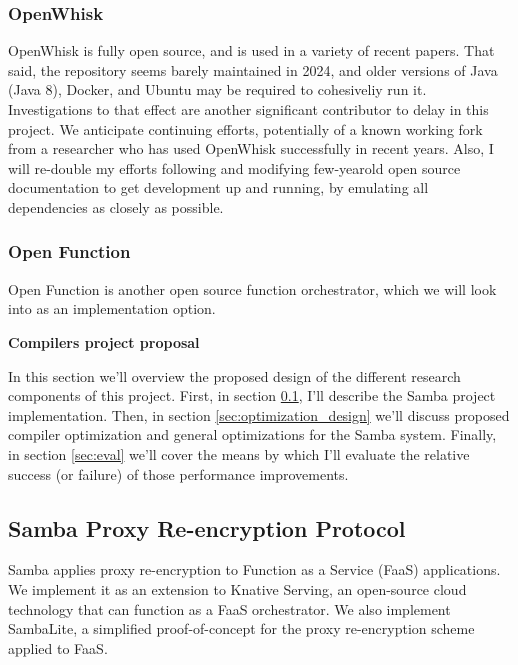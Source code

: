 \subsubsection{OpenWhisk}
OpenWhisk is fully open source, and is used in a variety of recent papers. That said, the repository seems barely maintained in 2024, and older versions of Java (Java 8), Docker, and Ubuntu may be required to cohesiveliy run it.
Investigations to that effect are another significant contributor to delay in this project.
We anticipate continuing efforts, potentially of a known working fork from a researcher who has used OpenWhisk successfully in recent years.
Also, I will re-double my efforts following and modifying few-yearold open source documentation to get development up and running, by emulating all dependencies as closely as possible.

\subsubsection{Open Function}
Open Function is another open source function orchestrator, which we will look into as an implementation option.

\textbf{Compilers project proposal}

In this section we'll overview the proposed design of the different research components of this project. First, in section \ref{sec:samba}, I'll describe the Samba project implementation. Then, in section \ref{sec:optimization_design} we'll discuss proposed compiler optimization and general optimizations for the Samba system. Finally, in section \ref{sec:eval} we'll cover the means by which I'll evaluate the relative success (or failure) of those performance improvements.

\subsection{Samba Proxy Re-encryption Protocol}
\label{sec:samba}

Samba applies proxy re-encryption to Function as a Service (FaaS) applications.
We implement it as an extension to Knative Serving, an open-source cloud technology that can function as a FaaS orchestrator.
We also implement SambaLite, a simplified proof-of-concept for the proxy re-encryption scheme applied to FaaS.

